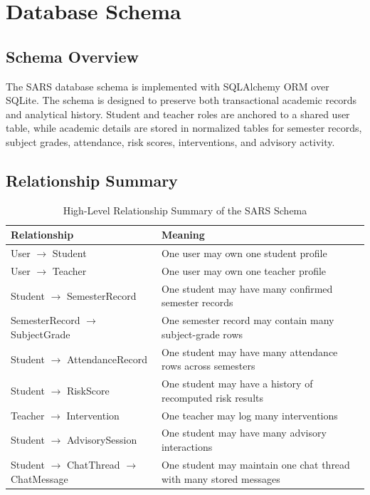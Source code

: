\chapter{Database Schema}

\section{Schema Overview}
The SARS database schema is implemented with SQLAlchemy ORM over SQLite. The schema is designed to preserve both transactional academic records and analytical history. Student and teacher roles are anchored to a shared user table, while academic details are stored in normalized tables for semester records, subject grades, attendance, risk scores, interventions, and advisory activity.

\section{Relationship Summary}
\begin{table}[H]
\centering
\caption{High-Level Relationship Summary of the SARS Schema}
\begin{tabularx}{\textwidth}{>{\raggedright\arraybackslash}p{} >{\raggedright\arraybackslash}X}
\toprule
\textbf{Relationship} & \textbf{Meaning} \\
\midrule
User $\rightarrow$ Student & One user may own one student profile \\
User $\rightarrow$ Teacher & One user may own one teacher profile \\
Student $\rightarrow$ SemesterRecord & One student may have many confirmed semester records \\
SemesterRecord $\rightarrow$ SubjectGrade & One semester record may contain many subject-grade rows \\
Student $\rightarrow$ AttendanceRecord & One student may have many attendance rows across semesters \\
Student $\rightarrow$ RiskScore & One student may have a history of recomputed risk results \\
Teacher $\rightarrow$ Intervention & One teacher may log many interventions \\
Student $\rightarrow$ AdvisorySession & One student may have many advisory interactions \\
Student $\rightarrow$ ChatThread $\rightarrow$ ChatMessage & One student may maintain one chat thread with many stored messages \\
\bottomrule
\end{tabularx}
\end{table}

